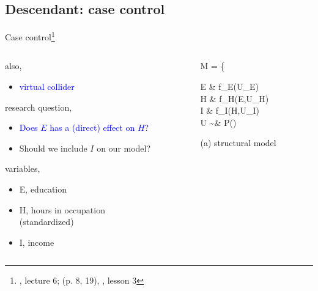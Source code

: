 \subsection{Descendant: case control}
%
%
\begin{frame}[t, negative]
	\subsectionpage
\end{frame}
%
%
\begin{frame}
	{Case control\footnote{\citet{McElreath_2022}, lecture 6; \citet{Cinelli_et_al_2021} (p. 8, 19), \citet{Hernan_2020}, lesson 3}}
	\begin{columns}
		\begin{column}{0.5\textwidth}
			also, 
			\begin{itemize}
				\item \textcolor{blue}{virtual collider}
			\end{itemize}
			
			research question, 
			\begin{itemize}
				\item \textcolor{blue}{Does $E$ has a (direct) effect on $H$?}
				\item Should we include $I$ on our model?
			\end{itemize}
			
			variables,
			\begin{itemize}
				\item E, education 
				\item H, hours in occupation \\
				{\small (standardized)}
				\item I, income
			\end{itemize}
		\end{column}
		\begin{column}{0.5\textwidth}  
			\begin{equ}
				M = \left\{ \begin{aligned} 
					E \leftarrow & \; f_{E}(U_{E}) \\
					H \leftarrow & \; f_{H}(E,U_{H}) \\
					I \leftarrow & \; f_{I}(H,U_{I}) \\
					U \sim & \; P()
				\end{aligned} \right
				\caption*{(a) structural model}
			\end{equ}
			\begin{figure}
\end{figure}
\end{column}
\end{columns}
\end{frame}

